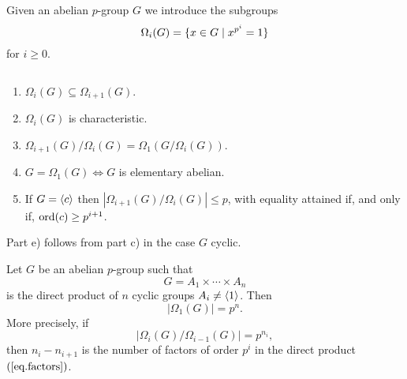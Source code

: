 \begin{ntn}
    Given an abelian\/ $p$-group\/ $G$ we introduce the subgroups
    $$
        \Omega_i(G) = \{x\in G\mid x^{p^i}=1\}
    $$
    for\/ $i\ge0$.
\end{ntn}

\begin{rem}\label{omega-props}${}$
    \begin{enumerate}[\rm a)]
        \item $\Omega_i(G)\subseteq\Omega_{i+1}(G)$. 
        \item $\Omega_i(G)$ is characteristic.
        \item $\Omega_{i+1}(G)/\Omega_i(G) = \Omega_1(G/\Omega_i(G))$.
        \item $G=\Omega_1(G)\iff G$ is elementary abelian.
        \item If\/ $G=\langle c\rangle$ then\/ $|\Omega_{i+1}(G)/\Omega_i(G)|\le p$, with equality attained if, and only if, ${\rm ord}(c)\ge p^{i+1}$.
    \end{enumerate}
    \textrm{\rm Part e) follows from part c) in the case $G$ cyclic.}
\end{rem}

\begin{thm}\label{cyclic-factors-of-order-p^i}
    Let\/ $G$ be an abelian\/ $p$-group such that
    \begin{equation}\label{eq.factors}\tag{*}
        G = A_1 \times \cdots \times A_n
    \end{equation}
    is the direct product of\/ $n$ cyclic groups\/ $A_i \ne\langle1\rangle$. Then
    $$
        |\Omega_1(G)| = p^n.
    $$
    More precisely, if
    $$
        |\Omega_i(G)/\Omega_{i-1}(G)| = p^{n_i},
    $$
    then\/ $n_i - n_{i+1}$ is the number of factors of order\/ $p^i$ in the direct product~$(\ref{eq.factors})$.
\end{thm}

